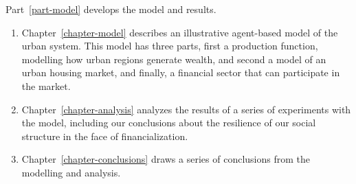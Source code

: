 Part~\ref{part-model} develops the model and results.
\begin{enumerate}
    \item Chapter~\ref{chapter-model} describes an illustrative agent-based model of the urban system. 
    This model has three  parts, first a production function, modelling how urban regions generate wealth, and second a model of an urban housing market, and finally, a financial sector that can participate in the market. 
    \item Chapter~\ref{chapter-analysis} analyzes the results of a series of experiments with the model, including our conclusions about the resilience of our social structure in the face of financialization.
    \item Chapter~\ref{chapter-conclusions} draws a series of conclusions from the modelling and analysis.
\end{enumerate}
